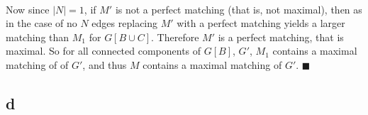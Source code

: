 \documentclass[letterpaper,12pt,oneside,onecolumn]{report}
\begin{document}
\paragraph{}
Now since $|N| = 1$, if $M'$ is not a perfect matching (that is, not maximal), then as in the case of no $N$ edges replacing $M'$ with a perfect matching yields a larger matching than $M_1$ for $G[B \cup C]$. Therefore $M'$ is a perfect matching, that is maximal. So for all connected components of $G[B]$, $G'$, $M_1$ contains a maximal matching of of $G'$, and thus $M$ contains a maximal matching of $G'$. $\blacksquare$
\subsection*{d}
\end{document}
